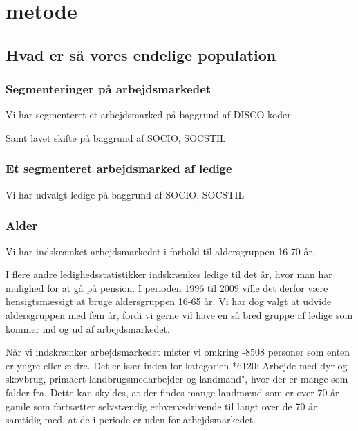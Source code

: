 
\chapter{metode} \label{metode}


\section{Hvad er så vores endelige population \label{}}


\subsection{Segmenteringer på arbejdsmarkedet}

Vi har segmenteret et arbejdsmarked på baggrund af DISCO-koder

Samt lavet skifte på baggrund af SOCIO, SOCSTIL



\subsection{Et segmenteret arbejdsmarked af ledige}

Vi har udvalgt ledige på baggrund af SOCIO, SOCSTIL



\subsection{Alder}

Vi har indskrænket arbejdsmarkedet i forhold til aldersgruppen 16-70 år.

I flere andre ledighedsstatistikker indskrænkes ledige til det år, hvor man har mulighed for at gå på pension. I perioden 1996 til 2009 ville det derfor være hensigtsmæssigt at bruge aldersgruppen 16-65 år. Vi har dog valgt at udvide aldersgruppen med fem år, fordi vi gerne vil have en så bred gruppe af ledige som kommer ind og ud af arbejdsmarkedet.


Når vi indskrænker arbejdsmarkedet mister vi omkring -8508 personer som enten er yngre eller ældre. Det er især inden for kategorien *6120: Arbejde med dyr og skovbrug, primaert landbrugsmedarbejder og landmand", hvor der er mange som falder fra. Dette kan skyldes, at der findes mange landmænd som er over 70 år gamle som fortsætter selvstændig erhvervsdrivende til langt over de 70 år samtidig med, at de i periode er uden for arbejdsmarkedet.







